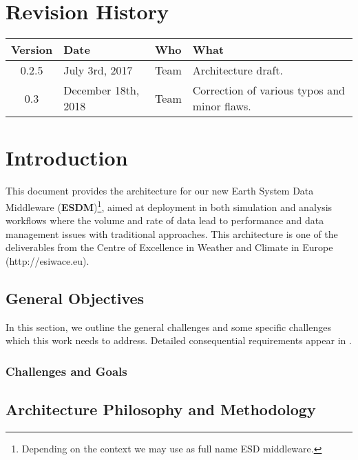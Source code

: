 \documentclass[a4paper,11pt]{esiwace-modified}
\begin{document}
\parskip 20pt

\chapter*{Revision History}

\begin{center}
\begin{tabular} {| c | l | l | l | } \hline
    Version & Date & Who & What  \\ \hline
    0.2.5 & July 3rd, 2017 & Team & Architecture draft. \\
    0.3 & December 18th, 2018 & Team & Correction of various typos and minor flaws. \\
    \hline
\end{tabular}
\end{center}


\chapter{Introduction}
\begin{chapterIntro}
This document provides the architecture for our new Earth System Data Middleware (\textbf{ESDM})\footnote{Depending on the context we may use as full name ESD middleware.},
aimed at deployment in both simulation and analysis workflows where the volume and rate of data lead to performance and data management issues with traditional approaches.
This architecture is one of the deliverables from the Centre of Excellence in Weather and Climate in Europe (http://esiwace.eu).
\end{chapterIntro}


\section{General Objectives}

In this section, we outline the general challenges and some specific challenges which this work needs to address.
Detailed consequential requirements appear in .

\subsection{Challenges and Goals}
\label{sec:esd goals}


\section{Architecture Philosophy and Methodology}
\label{sec:about 4+1}

\end{document}
